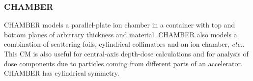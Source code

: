 \documentclass[12pt,twoside]{article}
\newcommand{\etc}{{\em etc.}}
\begin{document}
\begin{small}

\end{small}


\clearpage

\subsubsection{CHAMBER}
\label{chamber_cm}
\renewcommand{\rightmark}{CHAMBER CM}

CHAMBER models a parallel-plate ion chamber in a container with top and bottom
planes of arbitrary thickness and material. CHAMBER also
models a combination of scattering foils, cylindrical
collimators and an ion chamber, \etc. This CM is also useful for
central-axis
depth-dose calculations and for analysis of dose components due to
particles coming from different parts of an accelerator.
CHAMBER has cylindrical symmetry.
\end{document}
